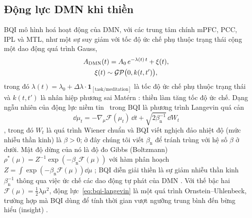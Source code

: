 \subsection{Động lực DMN khi thiền}
\label{sec:theory-dmn}
BQI mô hình hoá hoạt động của DMN, với các trung tâm chính mPFC, PCC, IPL và MTL, như một sự suy giảm với tốc độ ức chế phụ thuộc trạng thái cộng một dao động quá trình Gauss,
\begin{equation}
  \begin{gathered}
  A_{\mathrm{DMN}}(t)=A_0\,e^{-\lambda(t)\,t}+\xi(t),\\
  \xi(t)\sim\mathcal{GP}\bigl(0,k(t,t')\bigr),
  \end{gathered}
  \label{eq:bqi-dmn}
\end{equation}
trong đó $\lambda(t)=\lambda_0+\Delta\lambda\cdot\mathbf 1_{[\text{task/meditation}]}$ là tốc độ ức chế phụ thuộc trạng thái và $k(t,t')$ là nhân hiệp phương sai Mat\'ern \cite[Mục~7.1, pt.~(51)]{BQI}: thiền làm tăng tốc độ ức chế. Dạng ngẫu nhiên của động lực niềm tin~\cite[pt.~(7)]{BQI} trong BQI là phương trình Langevin quá cản
\begin{equation}
  \dd\mu_t=-\nabla_\mu\mathcal F(\mu_t)\,\dd t+\sqrt{2\beta_{\mathrm n}^{-1}}\,\dd W_t
  \label{eq:bqi-langevin}
\end{equation}
\cite[Mục~12.2.1, pt.~(83)]{BQI}, trong đó $W_t$ là quá trình Wiener chuẩn và BQI viết nghịch đảo nhiệt độ (mức nhiễu thần kinh) là $\beta>0$; ở đây chúng tôi viết $\beta_{\mathrm n}$ để tránh trùng với hệ số $\beta$ ở dưới. Mật độ dừng của nó là độ đo Gibbs (Boltzmann) $\rho^*(\mu)=Z^{-1}\exp(-\beta_{\mathrm n}\mathcal F(\mu))$ với hàm phân hoạch $Z=\int\exp(-\beta_{\mathrm n}\mathcal F(\mu))\dd\mu$ \cite[pt.~(85)]{BQI}; BQI diễn giải thiền là sự giảm nhiễu thần kinh $\beta_{\mathrm n}^{-1}$ thông qua việc ức chế các dao động tự phát của DMN \cite[Hệ quả~12.1]{BQI}. Với thế bậc hai $\mathcal F(\mu)=\tfrac12\lambda\mu^2$, động lực~\eqref{eq:bqi-langevin} là một quá trình Ornstein--Uhlenbeck, trường hợp mà BQI dùng để tính thời gian vượt ngưỡng trung bình đến bừng hiểu (insight) \cite[Mục~12.2.2, pt.~(86)--(87)]{BQI}.

